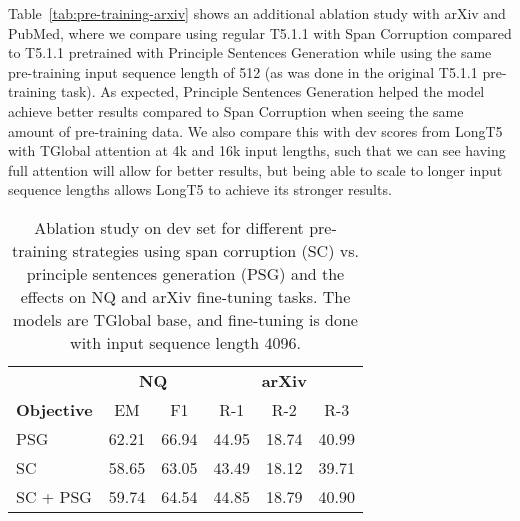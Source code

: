 \documentclass[11pt]{article}
\begin{document}
Table~\ref{tab:pre-training-arxiv} shows an additional ablation study with arXiv and PubMed, where we compare using regular T5.1.1 with Span Corruption compared to T5.1.1 pretrained with Principle Sentences Generation while using the same pre-training input sequence length of 512 (as was done in the original T5.1.1 pre-training task). As expected, Principle Sentences Generation helped the model achieve better results compared to Span Corruption when seeing the same amount of pre-training data.
We also compare this with dev scores from LongT5 with TGlobal attention at 4k and 16k input lengths, such that we can see having full attention will allow for better results, but being able to scale to longer input sequence lengths allows LongT5 to achieve its stronger results.



\begin{table}[t!]
\small
\centering
\begin{tabular}{lccccc}
\toprule
& \multicolumn{2}{c}{\textbf{NQ}} & \multicolumn{3}{c}{\textbf{arXiv}} \\
\textbf{Objective} & EM & F1 & R-1 & R-2 & R-3\\
\midrule
PSG & 62.21 & 66.94 & 44.95 & 18.74 & 40.99\\
\midrule
SC & 58.65 & 63.05 & 43.49 & 18.12 & 39.71 \\
SC + PSG & 59.74 & 64.54 & 44.85 & 18.79 & 40.90 \\
\bottomrule
\end{tabular}
\caption{Ablation study on dev set for different pre-training strategies using span corruption (SC) vs. principle sentences generation (PSG) and the effects on NQ and arXiv fine-tuning tasks. The models are TGlobal base, and fine-tuning is done with input sequence length 4096.}
\label{tab:pre-training}
\end{table}
\end{document}
